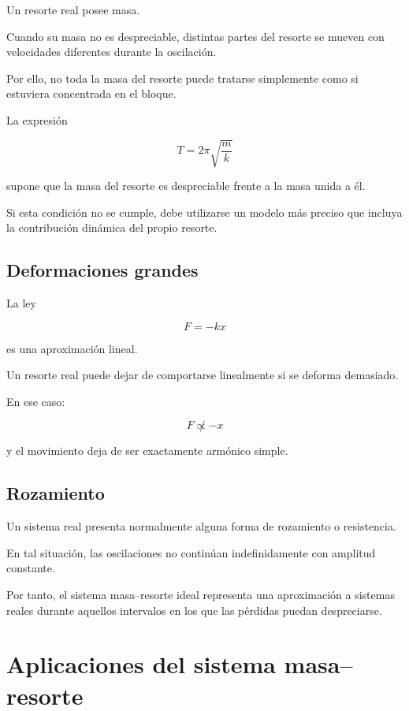 Un resorte real posee masa.

Cuando su masa no es despreciable, distintas partes del resorte se mueven con velocidades diferentes durante la oscilación.

Por ello, no toda la masa del resorte puede tratarse simplemente como si estuviera concentrada en el bloque.

\begin{aproximacion}
La expresión

\[ T=2\pi\sqrt{\frac{m}{k}} \]

supone que la masa del resorte es despreciable frente a la masa unida a él.

Si esta condición no se cumple, debe utilizarse un modelo más preciso que incluya la contribución dinámica del propio resorte.
\end{aproximacion}


\subsection{Deformaciones grandes}

La ley

\[ F=-kx \]

es una aproximación lineal.

Un resorte real puede dejar de comportarse linealmente si se deforma demasiado.

En ese caso:

\[ F\not\propto -x \]

y el movimiento deja de ser exactamente armónico simple.


\subsection{Rozamiento}

Un sistema real presenta normalmente alguna forma de rozamiento o resistencia.

En tal situación, las oscilaciones no continúan indefinidamente con amplitud constante.

Por tanto, el sistema masa--resorte ideal representa una aproximación a sistemas reales durante aquellos intervalos en los que las pérdidas puedan despreciarse.


\section{Aplicaciones del sistema masa--resorte}


